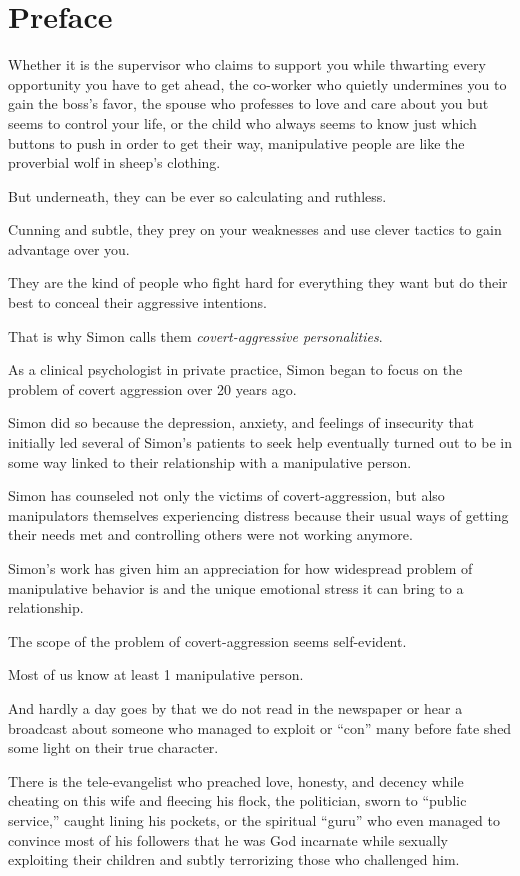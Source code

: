 \documentclass[oneside]{book}
\numberwithin{equation}{section}
\begin{document}
\section*{Preface}
Whether it is the supervisor who claims to support you while thwarting every opportunity you have to get ahead, the co-worker who quietly undermines you to gain the boss's favor, the spouse who professes to love and care about you but seems to control your life, or the child who always seems to know just which buttons to push in order to get their way, manipulative people are like the proverbial wolf in sheep's clothing.


But underneath, they can be ever so calculating and ruthless.

Cunning and subtle, they prey on your weaknesses and use clever tactics to gain advantage over you.

They are the kind of people who fight hard for everything they want but do their best to conceal their aggressive intentions.

That is why Simon calls them \textit{covert-aggressive personalities}.

%
As a clinical psychologist in private practice, Simon began to focus on the problem of covert aggression over 20 years ago.

Simon did so because the depression, anxiety, and feelings of insecurity that initially led several of Simon's patients to seek help eventually turned out to be in some way linked to their relationship with a manipulative person.

Simon has counseled not only the victims of covert-aggression, but also manipulators themselves experiencing distress because their usual ways of getting their needs met and controlling others were not working anymore.

Simon's work has given him an appreciation for how widespread problem of manipulative behavior is and the unique emotional stress it can bring to a relationship.

%
The scope of the problem of covert-aggression seems self-evident.

Most of us know at least 1 manipulative person.

And hardly a day goes by that we do not read in the newspaper or hear a broadcast about someone who managed to exploit or ``con'' many before fate shed some light on their true character.

There is the tele-evangelist who preached love, honesty, and decency while cheating on this wife and fleecing his flock, the politician, sworn to ``public service,'' caught lining his pockets, or the spiritual ``guru'' who even managed to convince most of his followers that he was God incarnate while sexually exploiting their children and subtly terrorizing those who challenged him.
\end{document}
